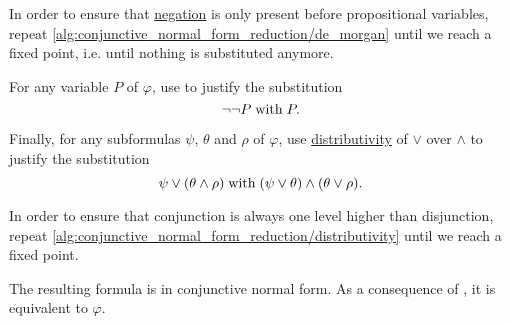 \begin{algorithm}
\begin{thmenum}
    In order to ensure that \hyperref[def:propositional_language/negation]{negation} is only present before propositional variables, repeat \ref{alg:conjunctive_normal_form_reduction/de_morgan} until we reach a fixed point, i.e. until nothing is substituted anymore.

     For any variable \( P \) of \( \varphi \), use  to justify the substitution
    \begin{equation*}
      \neg \neg P \T{with} P.
    \end{equation*}

     Finally, for any subformulas \( \psi \), \( \theta \) and \( \rho \) of \( \varphi \), use \hyperref[eq:def:semilattice/distributive_lattice/finite/join_over_meet]{distributivity} of \( \vee \) over \( \wedge \) to justify the substitution
    \begin{equation*}
      \psi \vee (\theta \wedge \rho) \T{with} (\psi \vee \theta) \wedge (\theta \vee \rho).
    \end{equation*}

    In order to ensure that conjunction is always one level higher than disjunction, repeat \ref{alg:conjunctive_normal_form_reduction/distributivity} until we reach a fixed point.
  \end{thmenum}

  The resulting formula is in conjunctive normal form. As a consequence of , it is equivalent to \( \varphi \).
\end{algorithm}
